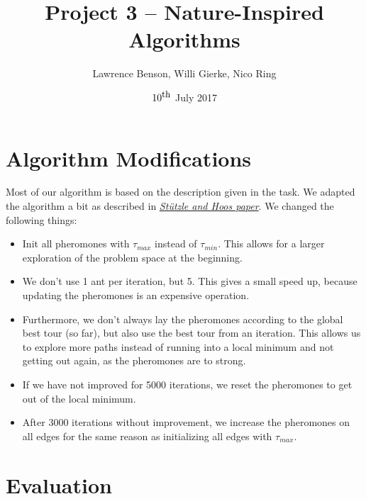 \documentclass{article}
\title{Project 3 – Nature-Inspired Algorithms}
\author{Lawrence Benson, Willi Gierke, Nico Ring}
\date{$10^{\textnormal{\small{th}}}$ July 2017}
\begin{document}
\maketitle

\section{Algorithm Modifications}
Most of our algorithm is based on the description given in the task. We adapted the algorithm a bit as described in \href{https://svn-d1.mpi-inf.mpg.de/AG1/MultiCoreLab/papers/StuetzleHoos00\%20-\%20MMAS.pdf}{\textit{Stützle and Hoos paper}}. We changed the following things:
\begin{itemize}
    \item{Init all pheromones with $\tau_{max}$ instead of $\tau_{min}$. This allows for a larger exploration of the problem space at the beginning.}
    \item{We don't use 1 ant per iteration, but 5. This gives a small speed up, because updating the pheromones is an expensive operation.}
    \item{Furthermore, we don't always lay the pheromones according to the global best tour (so far), but also use the best tour from an iteration. This allows us to explore more paths instead of running into a local minimum and not getting out again, as the pheromones are to strong.}
    \item{If we have not improved for 5000 iterations, we reset the pheromones to get out of the local minimum.}
    \item{After 3000 iterations without improvement, we increase the pheromones on all edges for the same reason as initializing all edges with $\tau_{max}$.}
\end{itemize}
\section{Evaluation}
\end{document}
